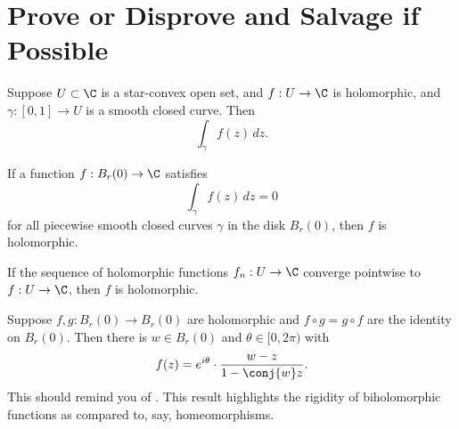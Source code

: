 \documentclass{homework}
\begin{document}
\section{Prove or Disprove and Salvage if Possible}

\begin{problem}\label{cauchy-for-starlike}Suppose $U \subset \C$ is a
  star-convex open set, and $f : U \to \C$ is holomorphic, and
  $\gamma : [0,1] \to U$ is a smooth closed curve.  Then
  \[
    \int_\gamma f(z) \, dz.
  \]
\end{problem}

\begin{problem}\label{moreras-theorem}If a function $f : B_r(0) \to \C$
  satisfies %
  \[
    \int_\gamma f(z) \, dz = 0
  \]
  for all piecewise smooth closed curves $\gamma$ in the disk
  $B_r(0)$, then $f$ is holomorphic.
\end{problem}

\begin{problem}\label{uniform-convergence-holomorphic}If the sequence of
  holomorphic functions $f_n : U \to \C$ converge pointwise to
  $f : U \to \C$, then $f$ is holomorphic.
\end{problem}

\begin{problem}\label{automorphisms-of-disk}Suppose $f, g : B_r(0) \to B_r(0)$ are holomorphic and
  $f \circ g = g \circ f$ are the identity on $B_r(0)$.  Then there is
  $w \in B_r(0)$ and $\theta \in [0,2\pi)$ with
  \[
    f(z) = e^{i\theta} \cdot \frac{w - z}{1 - \conj{w}z}.
  \]
  This should remind you of \label{blaschke-factors}.  This result
  highlights the rigidity of biholomorphic functions as compared to,
  say, homeomorphisms.
\end{problem}
\end{document}
